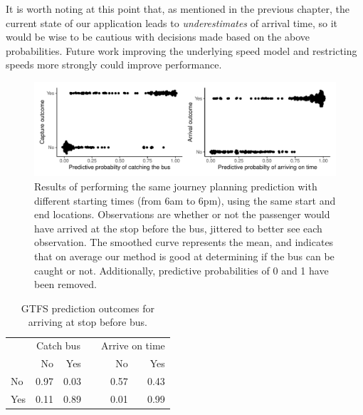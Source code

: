 It is worth noting at this point that, as mentioned in the previous chapter, the current state of our application leads to \emph{underestimates} of arrival time, so it would be wise to be cautious with decisions made based on the above probabilities. Future work improving the underlying speed model and restricting speeds more strongly could improve performance.




\begin{knitrout}
\color{fgcolor}\begin{figure}

{\centering \includegraphics[width=\textwidth]{figure/eta_journey_results_avg-1} 

}

\caption[Results of performing the same journey planning prediction with different starting times (from 6am to 6pm), using the same start and end locations]{Results of performing the same journey planning prediction with different starting times (from 6am to 6pm), using the same start and end locations. Observations are whether or not the passenger would have arrived at the stop before the bus, jittered to better see each observation. The smoothed curve represents the mean, and indicates that on average our method is good at determining if the bus can be caught or not. Additionally, predictive probabilities of 0 and 1 have been removed.}\label{fig:eta_journey_results_avg}
\end{figure}

\begin{table}

\caption{\label{tab:eta_journey_results_avg}GTFS prediction outcomes for arriving at stop before bus.}
\centering
\begin{tabular}[t]{lrrrrr}
\toprule
\multicolumn{1}{c}{ } & \multicolumn{2}{c}{Catch bus} & \multicolumn{1}{c}{} & \multicolumn{2}{c}{Arrive on time} \\
\cmidrule(l{3pt}r{3pt}){2-3} \cmidrule(l{3pt}r{3pt}){5-6}
  & No & Yes &  & No & Yes\\
\midrule
No & 0.97 & 0.03 &  & 0.57 & 0.43\\
Yes & 0.11 & 0.89 &  & 0.01 & 0.99\\
\bottomrule
\end{tabular}
\end{table}


\end{knitrout}


